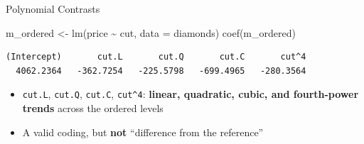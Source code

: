 \documentclass[
  ignorenonframetext,
  aspectratio=169,
]{beamer}
\newenvironment{Shaded}{\begin{snugshade}}{\end{snugshade}}
\newcommand{\AttributeTok}[1]{\textcolor[rgb]{0.40,0.45,0.13}{#1}}
\newcommand{\FunctionTok}[1]{\textcolor[rgb]{0.28,0.35,0.67}{#1}}
\newcommand{\NormalTok}[1]{\textcolor[rgb]{0.00,0.23,0.31}{#1}}
\newcommand{\OtherTok}[1]{\textcolor[rgb]{0.00,0.23,0.31}{#1}}
\newcommand{\SpecialCharTok}[1]{\textcolor[rgb]{0.37,0.37,0.37}{#1}}
\providecommand{\tightlist}{%
  \setlength{\itemsep}{0pt}\setlength{\parskip}{0pt}}\usepackage{longtable,booktabs,array}
\begin{document}
\begin{frame}[fragile]{Polynomial Contrasts}
\protect\hypertarget{polynomial-contrasts}{}
\begin{Shaded}
\begin{Highlighting}[]
\NormalTok{m\_ordered }\OtherTok{\textless{}{-}} \FunctionTok{lm}\NormalTok{(price }\SpecialCharTok{\textasciitilde{}}\NormalTok{ cut, }\AttributeTok{data =}\NormalTok{ diamonds)}
\FunctionTok{coef}\NormalTok{(m\_ordered)}
\end{Highlighting}
\end{Shaded}

\begingroup\tiny\color{darkgray}

\begin{verbatim}
(Intercept)       cut.L       cut.Q       cut.C       cut^4 
  4062.2364   -362.7254   -225.5798   -699.4965   -280.3564 
\end{verbatim}

\endgroup

\begin{itemize}
\tightlist
\item
  \texttt{cut.L}, \texttt{cut.Q}, \texttt{cut.C}, \texttt{cut\^{}4}:
  \textbf{linear, quadratic, cubic, and fourth-power trends} across the
  ordered levels
\item
  A valid coding, but \textbf{not} ``difference from the reference''
\end{itemize}
\end{frame}
\end{document}
